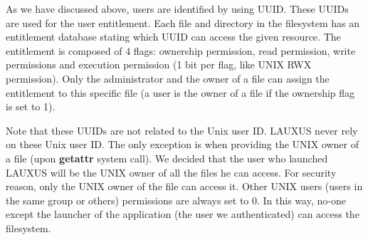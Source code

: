 \documentclass[../main.tex]{subfiles}
\begin{document}
\par As we have discussed above, users are identified by using UUID. These UUIDs are used for the user entitlement. Each file and directory in the filesystem has an entitlement database stating which UUID can access the given resource. The entitlement is composed of 4 flags: ownership permission, read permission, write permissions and execution permission (1 bit per flag, like UNIX RWX permission). Only the administrator and the owner of a file can assign the entitlement to this specific file (a user is the owner of a file if the ownership flag is set to 1).
\par Note that these UUIDs are not related to the Unix user ID. LAUXUS never rely on these Unix user ID. The only exception is when providing the UNIX owner of a file (upon \textbf{getattr} system call). We decided that the user who launched LAUXUS will be the UNIX owner of all the files he can access. For security reason, only the UNIX owner of the file can access it. Other UNIX users (users in the same group or others) permissions are always set to 0. In this way, no-one except the launcher of the application (the user we authenticated) can access the filesystem.
\end{document}
